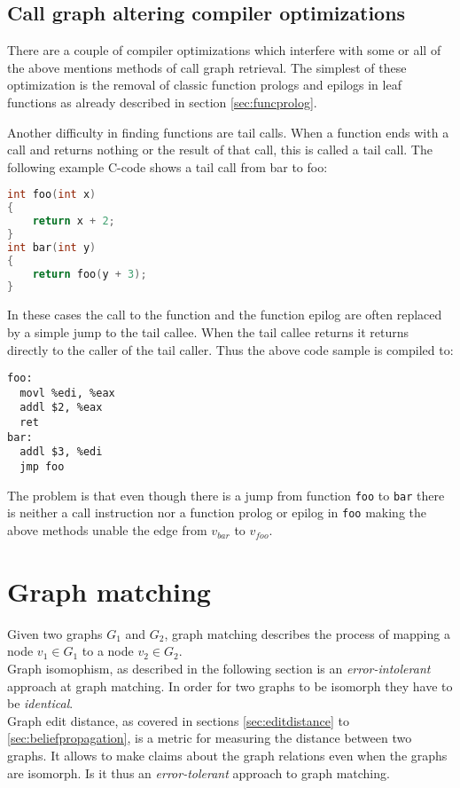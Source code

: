 \documentclass[
    12pt,                               %
    DIV=14,                     %
    parskip=half+,              %
    bigheadings,                %
    cleardoubleempty,   %
    halfparskip,                %
    ]{scrreprt} %
\begin{document}
\section{Call graph altering compiler optimizations} \label{sec:optimizationproblems}
There are a couple of compiler optimizations which interfere with some or all of the above mentions methods of call graph retrieval. The simplest of these optimization is the removal of classic function prologs and epilogs in leaf functions as already described in section \ref{sec:funcprolog}.

Another difficulty in finding functions are tail calls. When a function ends with a call and returns nothing or the result of that call, this is called a tail call. The following example C-code shows a tail call from bar to foo:
\begin{lstlisting}[language=C]
int foo(int x)
{
	return x + 2;
}
int bar(int y)
{
	return foo(y + 3);
}
\end{lstlisting}

In these cases the call to the function and the function epilog are often replaced by a simple jump to the tail callee. When the tail callee returns it returns directly to the caller of the tail caller. Thus the above code sample is compiled to:
\begin{lstlisting}
foo:
  movl %edi, %eax
  addl $2, %eax
  ret
bar:
  addl $3, %edi
  jmp foo
\end{lstlisting}

The problem is that even though there is a jump from function \verb'foo' to \verb'bar' there is neither a call instruction nor a function prolog or epilog in \verb'foo' making the above methods unable the edge from $v_{bar}$ to $v_{foo}$.


\chapter{Graph matching} \label{chap:graphmatching}
Given two graphs $G_1$ and $G_2$, graph matching describes the process of mapping a node $v_1 \in G_1$ to a node $v_2 \in G_2$. \\
Graph isomophism, as described in the following section is an \textit{error-intolerant} approach at graph matching. In order for two graphs to be isomorph they have to be \textit{identical}. \\
Graph edit distance, as covered in sections \ref{sec:editdistance} to \ref{sec:beliefpropagation}, is a metric for measuring the distance between two graphs. It allows to make claims about the graph relations even when the graphs are isomorph. Is it thus an \textit{error-tolerant} approach to graph matching.
\end{document}
